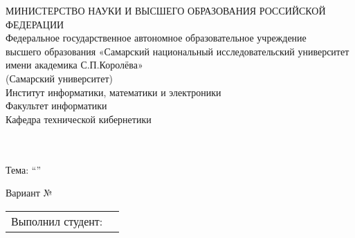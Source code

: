 



\begin{titlepage}
							
	\center
							
							
{МИНИСТЕРСТВО НАУКИ И ВЫСШЕГО ОБРАЗОВАНИЯ РОССИЙСКОЙ\\ [-0.2cm]ФЕДЕРАЦИИ}\\[-0.2cm]
{Федеральное государственное автономное образовательное учреждение \\[-0.2cm] высшего образования
«Самарский национальный исследовательский университет \\
[-0.2cm] имени академика С.П.Королёва»\\
[-0.2cm](Самарский университет)}\\[0.1cm]
{Институт информатики, математики и электроники}\\[-0.2cm]
{Факультет информатики}\\[-0.2cm]
{Кафедра технической кибернетики}\\[0.5cm]
						
							
	\vfill\vfill
						    
							
	{\textbf{\subjectTitle}}\\[0.3cm]
	
	{\taskTitle}\\[0.5cm]
						  
    {Тема: \enquote{\textbf{\theme}}}\\[0.5cm]

    \vfill
    
   {Вариант № \variantNumber}\\[0.5cm]


	\vfill\vfill\vfill\vfill\vfill\vfill\vfill\vfill
							
	\begin{minipage}{1\textwidth}
		\begin{center}
			\begin{tabularx}{\textwidth}{X l}
				Выполнил студент:        & \firstAuthorSurName \firstAuthorInitials \\


\end{tabularx}
\end{center}
\end{minipage}
\end{titlepage}
